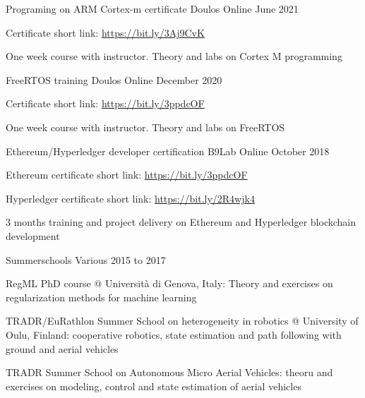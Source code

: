 \vspace*{4pt}

\cventry
{Programing on ARM Cortex-m certificate} %
{Doulos} %
{Online} %
{June 2021} %
{
  \begin{cvitems} %
    \item{Certificate short link: \url{https://bit.ly/3Aj9CvK}}
  \end{cvitems}
  \vspace{16pt}
  \begin{cvparagraph}
    One week course with instructor. Theory and labs on Cortex M programming
  \end{cvparagraph}
  \vspace*{-25pt}
}
\cventry
{FreeRTOS training} %
{Doulos} %
{Online} %
{December 2020} %
{
  \begin{cvitems} %
    \item{Certificate short link: \url{https://bit.ly/3ppdcOF}}
  \end{cvitems}
  \vspace{16pt}
  \begin{cvparagraph}
    One week course with instructor. Theory and labs on FreeRTOS
  \end{cvparagraph}
  \vspace*{-20pt}
}
\cventry
{Ethereum/Hyperledger developer certification} %
{B9Lab} %
{Online} %
{October 2018} %
{
  \begin{cvitems} %
    \item{Ethereum certificate short link: \url{https://bit.ly/3ppdcOF}}
    \item{Hyperledger certificate short link: \url{https://bit.ly/2R4wjk4}}
  \end{cvitems}
  \vspace{16pt}
  \begin{cvparagraph}
    3 months training and project delivery on Ethereum and Hyperledger blockchain development
  \end{cvparagraph}
  \vspace*{-20pt}
}
\cventry
{Summerschools} %
{Various} %
{} %
{2015 to 2017} %
{
  \begin{cvitems} %
    \item{RegML PhD course @ Università di Genova, Italy: Theory and exercises on regularization methods for machine learning}
    \item{TRADR/EuRathlon Summer School on heterogeneity in robotics @ University of Oulu, Finland: cooperative robotics, state estimation and path following with ground and aerial vehicles}
    \item{TRADR Summer School on Autonomous Micro Aerial Vehicles: theoru and exercises on modeling, control and state estimation of aerial vehicles}
  \end{cvitems}
  \vspace*{15pt}
}
